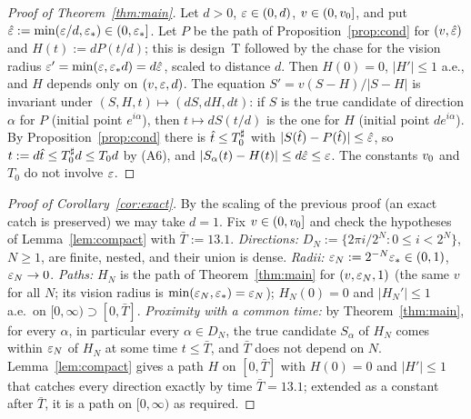 \begin{proof}[Proof of Theorem~\ref{thm:main}]
Let $d>0$, $\varepsilon\in(0,d)$, $v\in(0,v_0]$, and put $\hat{\varepsilon}:=\min(\varepsilon/d,\varepsilon_*)\in(0,\varepsilon_*]$. Let $P$ be the path of
Proposition~\ref{prop:cond} for $(v,\hat{\varepsilon})$ and $H(t):=dP(t/d)$; this is design~T followed by the chase for the vision radius
$\varepsilon'=\min(\varepsilon,\varepsilon_* d)=d\hat{\varepsilon}$, scaled to distance $d$. Then $H(0)=0$, $|H'|\le1$ a.e., and $H$ depends only on $(v,\varepsilon,d)$.
The equation $S'=v(S-H)/|S-H|$ is invariant under $(S,H,t)\mapsto(dS,dH,dt)$: if $S$ is the true candidate of direction $\alpha$ for
$P$ (initial point $e^{i\alpha}$), then $t\mapsto dS(t/d)$ is the one for $H$ (initial point $de^{i\alpha}$). By
Proposition~\ref{prop:cond} there is $\hat t\le T_0^\sharp$ with $|S(\hat t)-P(\hat t)|\le\hat{\varepsilon}$, so $t:=d\hat t\le T_0^\sharp d\le T_0d$
by (A6), and $|S_\alpha(t)-H(t)|\le d\hat{\varepsilon}\le\varepsilon$. The constants $v_0$ and $T_0$ do not involve $\varepsilon$.
\end{proof}

\begin{proof}[Proof of Corollary~\ref{cor:exact}]
By the scaling of the previous proof (an exact catch is preserved) we may take $d=1$. Fix $v\in(0,v_0]$ and check the hypotheses
of Lemma~\ref{lem:compact} with $\bar T:=13.1$.
\emph{Directions:} $D_N:=\{2\pi i/2^N:0\le i<2^N\}$, $N\ge1$, are finite, nested, and their union is dense.
\emph{Radii:} $\varepsilon_N:=2^{-N}\varepsilon_*\in(0,1)$, $\varepsilon_N\to0$.
\emph{Paths:} $H_N$ is the path of Theorem~\ref{thm:main} for $(v,\varepsilon_N,1)$ (the same $v$ for all $N$; its vision radius is
$\min(\varepsilon_N,\varepsilon_*)=\varepsilon_N$); $H_N(0)=0$ and $|H_N'|\le1$ a.e.\ on $[0,\infty)\supset[0,\bar T]$.
\emph{Proximity with a common time:} by Theorem~\ref{thm:main}, for every $\alpha$, in particular every $\alpha\in D_N$, the true
candidate $S_\alpha$ of $H_N$ comes within $\varepsilon_N$ of $H_N$ at some time $t\le\bar T$, and $\bar T$ does not depend on $N$.
Lemma~\ref{lem:compact} gives a path $H$ on $[0,\bar T]$ with $H(0)=0$ and $|H'|\le1$ that catches every direction exactly by time
$\bar T=13.1$; extended as a constant after $\bar T$, it is a path on $[0,\infty)$ as required.
\end{proof}
